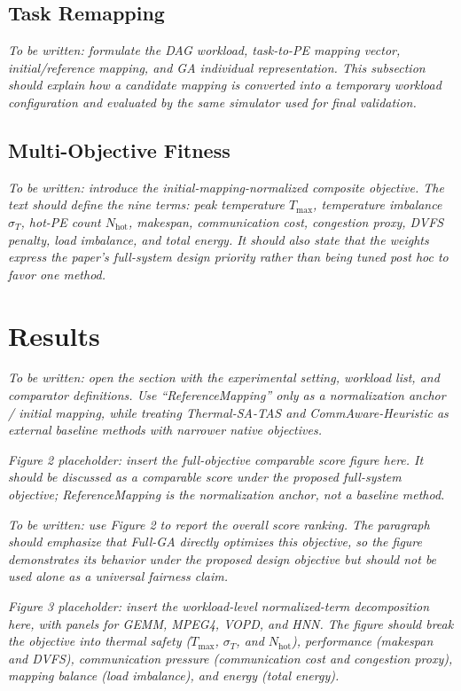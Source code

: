 \documentclass[conference]{IEEEtran}
\begin{document}
\subsection{Task Remapping}

\noindent\textit{To be written: formulate the DAG workload, task-to-PE mapping vector, initial/reference mapping, and GA individual representation. This subsection should explain how a candidate mapping is converted into a temporary workload configuration and evaluated by the same simulator used for final validation.}

\subsection{Multi-Objective Fitness}

\noindent\textit{To be written: introduce the initial-mapping-normalized composite objective. The text should define the nine terms: peak temperature $T_{\max}$, temperature imbalance $\sigma_T$, hot-PE count $N_{\mathrm{hot}}$, makespan, communication cost, congestion proxy, DVFS penalty, load imbalance, and total energy. It should also state that the weights express the paper's full-system design priority rather than being tuned post hoc to favor one method.}

\section{Results}

\noindent\textit{To be written: open the section with the experimental setting, workload list, and comparator definitions. Use ``ReferenceMapping'' only as a normalization anchor / initial mapping, while treating Thermal-SA-TAS and CommAware-Heuristic as external baseline methods with narrower native objectives.}

\noindent\textit{Figure 2 placeholder: insert the full-objective comparable score figure here. It should be discussed as a comparable score under the proposed full-system objective; ReferenceMapping is the normalization anchor, not a baseline method.}

\noindent\textit{To be written: use Figure 2 to report the overall score ranking. The paragraph should emphasize that Full-GA directly optimizes this objective, so the figure demonstrates its behavior under the proposed design objective but should not be used alone as a universal fairness claim.}

\noindent\textit{Figure 3 placeholder: insert the workload-level normalized-term decomposition here, with panels for GEMM, MPEG4, VOPD, and HNN. The figure should break the objective into thermal safety ($T_{\max}$, $\sigma_T$, and $N_{\mathrm{hot}}$), performance (makespan and DVFS), communication pressure (communication cost and congestion proxy), mapping balance (load imbalance), and energy (total energy).}
\end{document}
